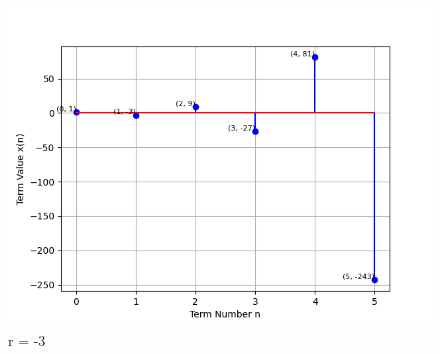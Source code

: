 \documentclass[journal,12pt,twocolumn]{IEEEtran}
\theoremstyle{remark}
\begin{document}
\begin{figure}
   \centering
     \includegraphics[width=1\columnwidth, height=1\columnwidth]{figs/graph1.png}
     \caption{r = -3}
\end{figure}
\end{document}
